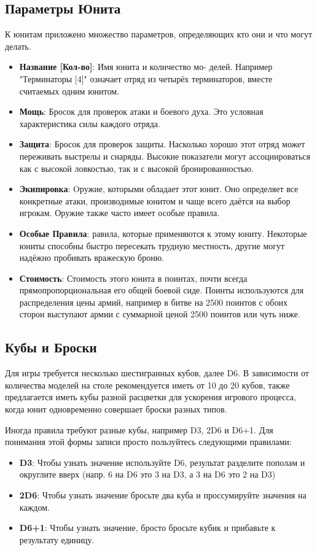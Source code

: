 \documentclass[twocolumn]{article}
\newcommand{\h}[1]{\textbf{#1}}
\newcommand{\D}[1][6]{D#1\xspace}
\newcommand{\subsec}[1]{\subsection{#1}\label{subsec:#1}}
\begin{document}
\subsec{Параметры Юнита}
К юнитам приложено множество параметров, определяющих кто они и что могут делать.

\begin{itemize}
    \item \h{Название [Кол-во]}: Имя юнита и количество мо- делей. Например "Терминаторы [4]" означает отряд из четырёх терминаторов, вместе считаемых одним юнитом.
    \item \h{Мощь}: Бросок для проверок атаки и боевого духа. Это условная характеристика силы каждого отряда.
    \item \h{Защита}: Бросок для проверок защиты. Насколько хорошо этот отряд может переживать выстрелы и снаряды. Высокие показатели могут ассоциироваться как с высокой ловкостью, так и с высокой бронированностью.
    \item \h{Экипировка}: Oружие, которыми обладает этот юнит. Оно определяет все конкретные атаки, производимые юнитом и чаще всего даётся на выбор игрокам. Оружие также часто имеет особые правила.
    \item \h{Особые Правила}: равила, которые применяются к этому юниту. Некоторые юниты способны быстро пересекать трудную местность, другие могут надёжно пробивать вражескую броню.
    \item \h{Стоимость}: Стоимость этого юнита в поинтах, почти всегда прямопропорциональная его общей боевой сиде. Поинты используются для распределения цены армий, например в битве на 2500 поинтов с обоих сторон выступают армии с суммарной ценой 2500 поинтов или чуть ниже. 
\end{itemize}

\subsec{Кубы и Броски}
Для игры требуется несколько шестигранных кубов, далее \D[6]. В зависимости от количества моделей на столе рекомендуется иметь от 10 до 20 кубов, также предлагается иметь кубы разной расцветки для ускорения игрового процесса, когда юнит одновременно совершает броски разных типов.

Иногда правила требуют разные кубы, например \D[3], 2\D и \D+1. Для понимания этой формы записи просто пользуйтесь следующими правилами:

\begin{itemize}
    \item \h{\D[3]}: Чтобы узнать значение используйте \D, результат разделите пополам и округлите вверх (напр. 6 на \D  это 3 на \D[3], а 3 на \D это 2 на \D[3])
    \item \h{2\D}: Чтобы узнать значение бросьте два куба и проссумируйте значения на каждом.
    \item \h{\D[6]+1}: Чтобы узнать значение, бросто бросьте кубик и прибавьте к результату единицу.
\end{itemize}
\end{document}
